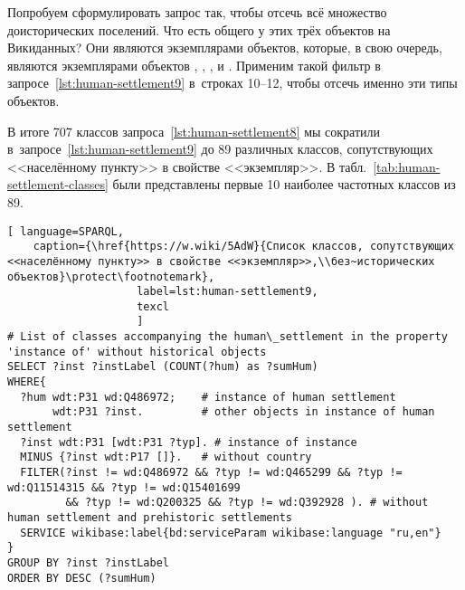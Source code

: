 Попробуем сформулировать запрос так, чтобы отсечь всё множество доисторических поселений.  
Что есть общего у этих трёх объектов на Викиданных? 
Они являются экземплярами объектов, которые, в свою очередь, 
являются экземплярами объектов , 
, 
, 
и . 
Применим такой фильтр в запросе~\ref{lst:human-settlement9} в~строках 10--12, 
чтобы отсечь именно эти типы объектов.

В итоге 707 классов запроса~\ref{lst:human-settlement8} 
мы сократили в~запросе~\ref{lst:human-settlement9} 
до 89 различных классов, сопутствующих <<населённому пункту>> в свойстве <<экземпляр>>. 
В табл.~\ref{tab:human-settlement-classes} были представлены 
первые 10 наиболее частотных классов из 89. 



\newpage
\lstset{numbers=left, firstnumber=1, frame=single}
\begin{lstlisting}[ language=SPARQL, 
    caption={\href{https://w.wiki/5AdW}{Cписок классов, сопутствующих <<населённому пункту>> в свойстве <<экземпляр>>,\\без~исторических объектов}\protect\footnotemark},
                    label=lst:human-settlement9,
                    texcl 
                    ]
# List of classes accompanying the human\_settlement in the property 'instance of' without historical objects 
SELECT ?inst ?instLabel (COUNT(?hum) as ?sumHum)
WHERE{
  ?hum wdt:P31 wd:Q486972;    # instance of human settlement
       wdt:P31 ?inst.         # other objects in instance of human settlement
  ?inst wdt:P31 [wdt:P31 ?typ]. # instance of instance
  MINUS {?inst wdt:P17 []}.   # without country
  FILTER(?inst != wd:Q486972 && ?typ != wd:Q465299 && ?typ != wd:Q11514315 && ?typ != wd:Q15401699 
         && ?typ != wd:Q200325 && ?typ != wd:Q392928 ). # without human settlement and prehistoric settlements
  SERVICE wikibase:label{bd:serviceParam wikibase:language "ru,en"}
}
GROUP BY ?inst ?instLabel
ORDER BY DESC (?sumHum)
\end{lstlisting}%





